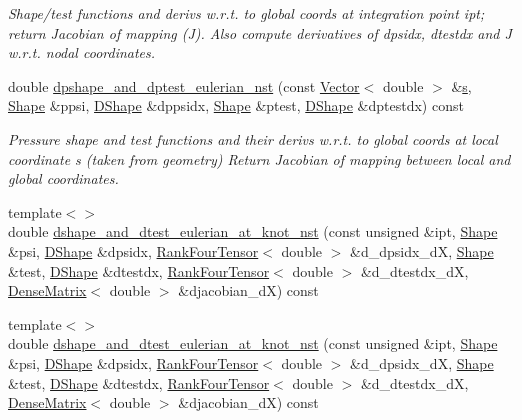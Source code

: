 \begin{DoxyCompactItemize}
\begin{DoxyCompactList}\small\item\em Shape/test functions and derivs w.\+r.\+t. to global coords at integration point ipt; return Jacobian of mapping (J). Also compute derivatives of dpsidx, dtestdx and J w.\+r.\+t. nodal coordinates. \end{DoxyCompactList}\item 
double \hyperlink{classoomph_1_1GeneralisedNewtonianQCrouzeixRaviartElement_a6fb21f312f636058e51f9598594076f0}{dpshape\+\_\+and\+\_\+dptest\+\_\+eulerian\+\_\+nst} (const \hyperlink{classoomph_1_1Vector}{Vector}$<$ double $>$ \&\hyperlink{cfortran_8h_ab7123126e4885ef647dd9c6e3807a21c}{s}, \hyperlink{classoomph_1_1Shape}{Shape} \&ppsi, \hyperlink{classoomph_1_1DShape}{D\+Shape} \&dppsidx, \hyperlink{classoomph_1_1Shape}{Shape} \&ptest, \hyperlink{classoomph_1_1DShape}{D\+Shape} \&dptestdx) const
\begin{DoxyCompactList}\small\item\em Pressure shape and test functions and their derivs w.\+r.\+t. to global coords at local coordinate s (taken from geometry) Return Jacobian of mapping between local and global coordinates. \end{DoxyCompactList}\item 
{\footnotesize template$<$$>$ }\\double \hyperlink{classoomph_1_1GeneralisedNewtonianQCrouzeixRaviartElement_adf5aa1d104a3b3095e69a5f698372a04}{dshape\+\_\+and\+\_\+dtest\+\_\+eulerian\+\_\+at\+\_\+knot\+\_\+nst} (const unsigned \&ipt, \hyperlink{classoomph_1_1Shape}{Shape} \&psi, \hyperlink{classoomph_1_1DShape}{D\+Shape} \&dpsidx, \hyperlink{classoomph_1_1RankFourTensor}{Rank\+Four\+Tensor}$<$ double $>$ \&d\+\_\+dpsidx\+\_\+dX, \hyperlink{classoomph_1_1Shape}{Shape} \&test, \hyperlink{classoomph_1_1DShape}{D\+Shape} \&dtestdx, \hyperlink{classoomph_1_1RankFourTensor}{Rank\+Four\+Tensor}$<$ double $>$ \&d\+\_\+dtestdx\+\_\+dX, \hyperlink{classoomph_1_1DenseMatrix}{Dense\+Matrix}$<$ double $>$ \&djacobian\+\_\+dX) const
\item 
{\footnotesize template$<$$>$ }\\double \hyperlink{classoomph_1_1GeneralisedNewtonianQCrouzeixRaviartElement_ac25045f98811380b97a00ffd657993b1}{dshape\+\_\+and\+\_\+dtest\+\_\+eulerian\+\_\+at\+\_\+knot\+\_\+nst} (const unsigned \&ipt, \hyperlink{classoomph_1_1Shape}{Shape} \&psi, \hyperlink{classoomph_1_1DShape}{D\+Shape} \&dpsidx, \hyperlink{classoomph_1_1RankFourTensor}{Rank\+Four\+Tensor}$<$ double $>$ \&d\+\_\+dpsidx\+\_\+dX, \hyperlink{classoomph_1_1Shape}{Shape} \&test, \hyperlink{classoomph_1_1DShape}{D\+Shape} \&dtestdx, \hyperlink{classoomph_1_1RankFourTensor}{Rank\+Four\+Tensor}$<$ double $>$ \&d\+\_\+dtestdx\+\_\+dX, \hyperlink{classoomph_1_1DenseMatrix}{Dense\+Matrix}$<$ double $>$ \&djacobian\+\_\+dX) const

\end{DoxyCompactItemize}
